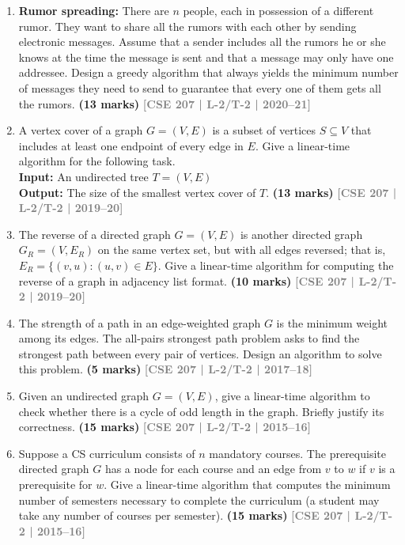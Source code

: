 \documentclass[12pt]{article}
\newcommand{\yr}[1]{\hfill\textcolor{gray}{\small\textbf{[#1]}}}
\newcommand{\mk}[1]{\textcolor{orange!70!black}{\small\textbf{(#1 marks)}}}
\begin{document}
\begin{enumerate}
\item \textbf{Rumor spreading:} There are $n$ people, each in possession of a different rumor. They want to share all the rumors with each other by sending electronic messages. Assume that a sender includes all the rumors he or she knows at the time the message is sent and that a message may only have one addressee. Design a greedy algorithm that always yields the minimum number of messages they need to send to guarantee that every one of them gets all the rumors.
\mk{13} \yr{CSE 207 | L-2/T-2 | 2020--21}


\item A vertex cover of a graph $G = (V, E)$ is a subset of vertices $S \subseteq V$ that includes at least one endpoint of every edge in $E$. Give a linear-time algorithm for the following task.\\
\textbf{Input:} An undirected tree $T = (V, E)$\\
\textbf{Output:} The size of the smallest vertex cover of $T$.
\mk{13} \yr{CSE 207 | L-2/T-2 | 2019--20}


\item The reverse of a directed graph $G = (V, E)$ is another directed graph $G_R = (V, E_R)$ on the same vertex set, but with all edges reversed; that is, $E_R = \{(v, u) : (u, v) \in E\}$. Give a linear-time algorithm for computing the reverse of a graph in adjacency list format.
\mk{10} \yr{CSE 207 | L-2/T-2 | 2019--20}


\item The strength of a path in an edge-weighted graph $G$ is the minimum weight among its edges. The all-pairs strongest path problem asks to find the strongest path between every pair of vertices. Design an algorithm to solve this problem. \mk{5}
\yr{CSE 207 | L-2/T-2 | 2017--18}


\item Given an undirected graph $G = (V, E)$, give a linear-time algorithm to check whether there is a cycle of odd length in the graph. Briefly justify its correctness. \mk{15}
\yr{CSE 207 | L-2/T-2 | 2015--16}


\item Suppose a CS curriculum consists of $n$ mandatory courses. The prerequisite directed graph $G$ has a node for each course and an edge from $v$ to $w$ if $v$ is a prerequisite for $w$. Give a linear-time algorithm that computes the minimum number of semesters necessary to complete the curriculum (a student may take any number of courses per semester). \mk{15}
\yr{CSE 207 | L-2/T-2 | 2015--16}



\end{enumerate}
\end{document}
